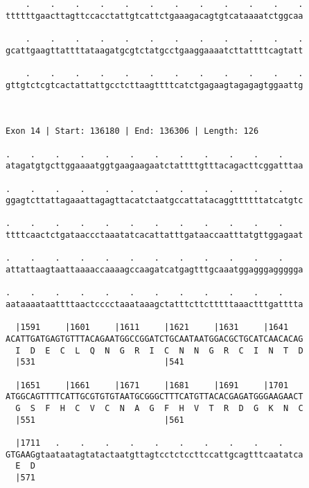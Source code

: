 \documentclass{article}
\begin{document}
\begin{Verbatim}
    .    .    .    .    .    .    .    .    .    .    .    .
ttttttgaacttagttccacctattgtcattctgaaagacagtgtcataaaatctggcaa
                                                            
    .    .    .    .    .    .    .    .    .    .    .    .
gcattgaagttattttataagatgcgtctatgcctgaaggaaaatcttattttcagtatt
                                                            
    .    .    .    .    .    .    .    .    .    .    .    .
gttgtctcgtcactattattgcctcttaagttttcatctgagaagtagagagtggaattg
                                                            
                                                            
 
Exon 14 | Start: 136180 | End: 136306 | Length: 126
 
.    .    .    .    .    .    .    .    .    .    .    .    
atagatgtgcttggaaaatggtgaagaagaatctattttgtttacagacttcggatttaa
                                                            
.    .    .    .    .    .    .    .    .    .    .    .    
ggagtcttattagaaattagagttacatctaatgccattatacaggttttttatcatgtc
                                                            
.    .    .    .    .    .    .    .    .    .    .    .    
ttttcaactctgataaccctaaatatcacattatttgataaccaatttatgttggagaat
                                                            
.    .    .    .    .    .    .    .    .    .    .    .    
attattaagtaattaaaaccaaaagccaagatcatgagtttgcaaatggagggaggggga
                                                            
.    .    .    .    .    .    .    .    .    .    .    .    
aataaaataattttaactcccctaaataaagctatttcttctttttaaactttgatttta
                                                            
  |1591     |1601     |1611     |1621     |1631     |1641   
ACATTGATGAGTGTTTACAGAATGGCCGGATCTGCAATAATGGACGCTGCATCAACACAG
  I  D  E  C  L  Q  N  G  R  I  C  N  N  G  R  C  I  N  T  D
  |531                          |541                        
  
  |1651     |1661     |1671     |1681     |1691     |1701   
ATGGCAGTTTTCATTGCGTGTGTAATGCGGGCTTTCATGTTACACGAGATGGGAAGAACT
  G  S  F  H  C  V  C  N  A  G  F  H  V  T  R  D  G  K  N  C
  |551                          |561                        
  
  |1711   .    .    .    .    .    .    .    .    .    .    
GTGAAGgtaataatagtatactaatgttagtcctctccttccattgcagtttcaatatca
  E  D                                                      
  |571                                                      
  

\end{Verbatim}
\end{document}
